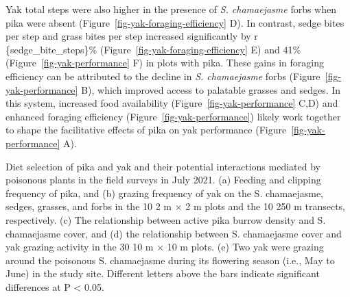 \documentclass[
  letterpaper,
  DIV=11,
  numbers=noendperiod]{scrartcl}
\begin{document}
Yak total steps were also higher in the presence of \emph{S.
chamaejasme} forbs when pika were absent
(Figure~\ref{fig-yak-foraging-efficiency} D). In contrast, sedge bites
per step and grass bites per step increased significantly by r
\{sedge\_bite\_steps\}\% (Figure~\ref{fig-yak-foraging-efficiency} E)
and 41\% (Figure~\ref{fig-yak-performance} F) in plots with pika. These
gains in foraging efficiency can be attributed to the decline in
\emph{S. chamaejasme} forbs (Figure~\ref{fig-yak-performance} B), which
improved access to palatable grasses and sedges. In this system,
increased food availability (Figure~\ref{fig-yak-performance} C,D) and
enhanced foraging efficiency (Figure~\ref{fig-yak-performance}) likely
work together to shape the facilitative effects of pika on yak
performance (Figure~\ref{fig-yak-performance} A).

\begin{fig}


\caption{\label{fig-diet-selection}Diet selection of pika and yak and
their potential interactions mediated by poisonous plants in the field
surveys in July 2021. (a) Feeding and clipping frequency of pika, and
(b) grazing frequency of yak on the S. chamaejasme, sedges, grasses, and
forbs in the 10 2 m × 2 m plots and the 10 250 m transects,
respectively. (c) The relationship between active pika burrow density
and S. chamaejasme cover, and (d) the relationship between S.
chamaejasme cover and yak grazing activity in the 30 10 m × 10 m plots.
(e) Two yak were grazing around the poisonous S. chamaejasme during its
flowering season (i.e., May to June) in the study site. Different
letters above the bars indicate significant differences at P \textless{}
0.05.}

\end{fig}%
\end{document}
